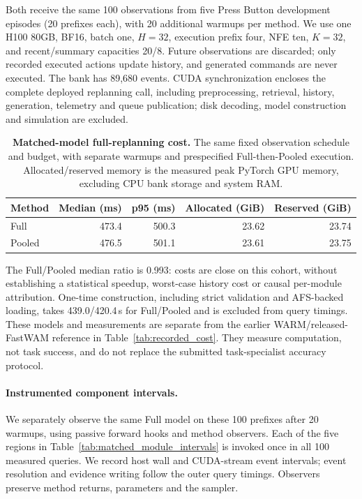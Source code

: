 Both receive the same 100 observations from five Press Button development episodes (20 prefixes each), with 20 additional warmups per method.
We use one H100 80GB, BF16, batch one, $H=32$, execution prefix four, NFE ten, $K=32$, and recent/summary capacities 20/8.
Future observations are discarded; only recorded executed actions update history, and generated commands are never executed. The bank has 89,680 events.
CUDA synchronization encloses the complete deployed replanning call, including preprocessing, retrieval, history, generation, telemetry and queue publication; disk decoding, model construction and simulation are excluded.

\begin{table}[htbp]
\centering\small
\caption{\textbf{Matched-model full-replanning cost.} The same fixed observation schedule and budget, with separate warmups and prespecified Full-then-Pooled execution. Allocated/reserved memory is the measured peak PyTorch GPU memory, excluding CPU bank storage and system RAM.}
\label{tab:matched_recorded_cost}
\begin{tabular}{@{}lrrrr@{}}
\toprule
Method & Median (ms) & p95 (ms) & Allocated (GiB) & Reserved (GiB) \\
\midrule
Full & 473.4 & 500.3 & 23.62 & 23.74 \\
Pooled & 476.5 & 501.1 & 23.61 & 23.75 \\
\bottomrule
\end{tabular}
\end{table}

The Full/Pooled median ratio is 0.993: costs are close on this cohort, without establishing a statistical speedup, worst-case history cost or causal per-module attribution.
One-time construction, including strict validation and AFS-backed loading, takes 439.0/420.4\,s for Full/Pooled and is excluded from query timings.
These models and measurements are separate from the earlier WARM/released-FastWAM reference in Table~\ref{tab:recorded_cost}. They measure computation, not task success, and do not replace the submitted task-specialist accuracy protocol.


\paragraph{Instrumented component intervals.}
We separately observe the same Full model on these 100 prefixes after 20 warmups, using passive forward hooks and method observers.
Each of the five regions in Table~\ref{tab:matched_module_intervals} is invoked once in all 100 measured queries.
We record host wall and CUDA-stream event intervals; event resolution and evidence writing follow the outer query timings. Observers preserve method returns, parameters and the sampler.

